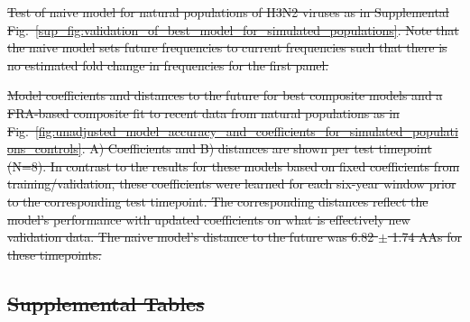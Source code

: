 \documentclass[9pt,lineno]{elife} %
\providecommand{\DIFdel}[1]{{\protect\color{red}\sout{#1}}}                      %
\providecommand{\DIFdelFL}[1]{\DIFdel{#1}} %
\providecommand{\DIFdeltex}[1]{{\protect\color{red}\sout{#1}}}                      %
\providecommand{\DIFdelFL}[1]{\DIFdel{#1}} %
\providecommand{\DIFdel}[1]{\texorpdfstring{\DIFdeltex{#1}}{}} %
\begin{document}
{%
\DIFdelFL{Test of naive model for natural populations of H3N2 viruses as in Supplemental Fig.~\ref{sup_fig:validation_of_best_model_for_simulated_populations}.
  Note that the naive model sets future frequencies to current frequencies such that there is no estimated fold change in frequencies for the first panel.
  }}

{%
\DIFdelFL{Model coefficients and distances to the future for best composite models and a FRA-based composite fit to recent data from natural populations as in Fig.~\ref{fig:unadjusted_model_accuracy_and_coefficients_for_simulated_populations_controls}.
    A) Coefficients and B) distances are shown per test timepoint (N=8).
    In contrast to the results for these models based on fixed coefficients from training/validation, these coefficients were learned for each six-year window prior to the corresponding test timepoint.
    The corresponding distances reflect the model's performance with updated coefficients on what is effectively new validation data.
    The naive model's distance to the future was 6.82 $\pm$ 1.74 AAs for these timepoints.
  }}

\subsection*{\DIFdel{Supplemental Tables}}
\end{document}
